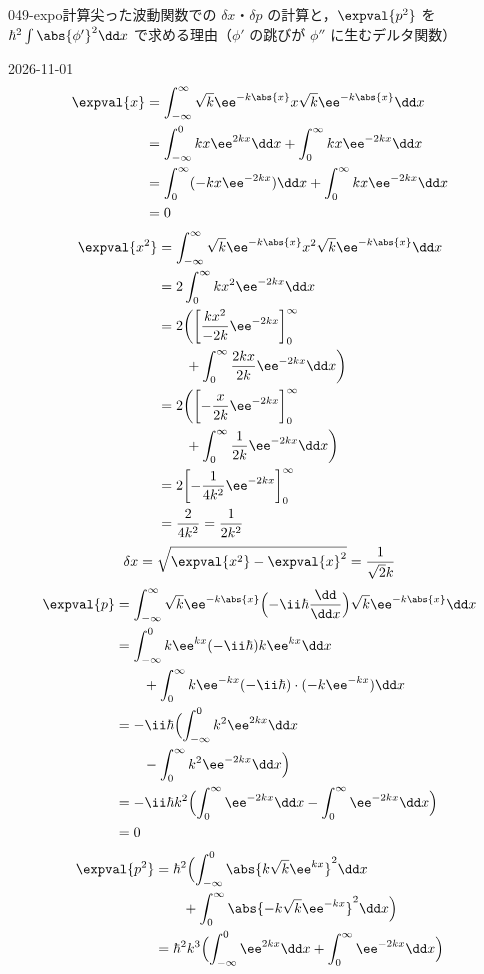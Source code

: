 \documentclass[uplatex,dvipdfmx,a4paper,11pt]{jsarticle}
\begin{document}
\begin{mondai}{049-expo}{計算}{尖った波動関数での $\delta x$・$\delta p$ の計算と，$\expval{p^{2}}$ を $\hbar^{2}\int\abs{\phi'}^{2}\dd x$ で求める理由（$\phi'$ の跳びが $\phi''$ に生むデルタ関数）}
\begin{kotaeutsushi}{2026-11-01}
\begin{align*}
\expval{x}&=\int_{-\infty}^{\infty}\sqrt{k}\ee^{-k\abs{x}}x\sqrt{k}\ee^{-k\abs{x}}\dd x\\
&=\int_{-\infty}^{0}kx\ee^{2kx}\dd x+\int_{0}^{\infty}kx\ee^{-2kx}\dd x\\
&=\int_{0}^{\infty}(-kx\ee^{-2kx})\dd x+\int_{0}^{\infty}kx\ee^{-2kx}\dd x\\
&=0
\end{align*}
\begin{align*}
\expval{x^{2}}&=\int_{-\infty}^{\infty}\sqrt{k}\ee^{-k\abs{x}}x^{2}\sqrt{k}\ee^{-k\abs{x}}\dd x\\
&=2\int_{0}^{\infty}kx^{2}\ee^{-2kx}\dd x\\
&=2\biggl(\biggl[\frac{kx^{2}}{-2k}\ee^{-2kx}\biggr]_{0}^{\infty}\\
&\qquad+\int_{0}^{\infty}\frac{2kx}{2k}\ee^{-2kx}\dd x\biggr)\\
&=2\biggl(\biggl[-\frac{x}{2k}\ee^{-2kx}\biggr]_{0}^{\infty}\\
&\qquad+\int_{0}^{\infty}\frac{1}{2k}\ee^{-2kx}\dd x\biggr)\\
&=2\biggl[-\frac{1}{4k^{2}}\ee^{-2kx}\biggr]_{0}^{\infty}\\
&=\frac{2}{4k^{2}}=\frac{1}{2k^{2}}
\end{align*}
\[ \delta x=\sqrt{\expval{x^{2}}-\expval{x}^{2}}=\frac{1}{\sqrt{2}k} \]
\begin{align*}
\expval{p}&=\int_{-\infty}^{\infty}\sqrt{k}\ee^{-k\abs{x}}\Bigl(-\ii\hbar\frac{\dd}{\dd x}\Bigr)\sqrt{k}\ee^{-k\abs{x}}\dd x\\
&=\int_{-\infty}^{0}k\ee^{kx}(-\ii\hbar)k\ee^{kx}\dd x\\
&\qquad+\int_{0}^{\infty}k\ee^{-kx}(-\ii\hbar)\cdot(-k\ee^{-kx})\dd x\\
&=-\ii\hbar\Bigl(\int_{-\infty}^{0}k^{2}\ee^{2kx}\dd x\\
&\qquad-\int_{0}^{\infty}k^{2}\ee^{-2kx}\dd x\Bigr)\\
&=-\ii\hbar k^{2}\Bigl(\int_{0}^{\infty}\ee^{-2kx}\dd x-\int_{0}^{\infty}\ee^{-2kx}\dd x\Bigr)\\
&=0
\end{align*}
\begin{align*}
\expval{p^{2}}&=\hbar^{2}\Bigl(\int_{-\infty}^{0}\abs{k\sqrt{k}\ee^{kx}}^{2}\dd x\\
&\qquad+\int_{0}^{\infty}\abs{-k\sqrt{k}\ee^{-kx}}^{2}\dd x\Bigr)\\
&=\hbar^{2}k^{3}\Bigl(\int_{-\infty}^{0}\ee^{2kx}\dd x+\int_{0}^{\infty}\ee^{-2kx}\dd x\Bigr)\\

\end{align*}
\end{kotaeutsushi}
\end{mondai}
\end{document}

